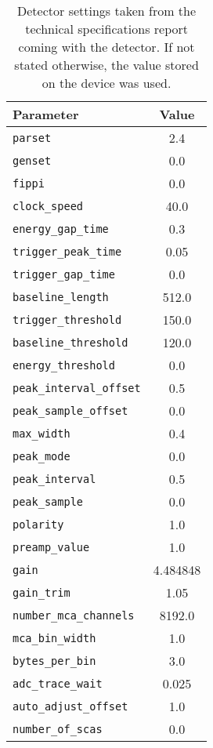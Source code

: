         \begin{table}[!h]
            \centering
            \caption[Detector settings]{Detector settings taken from the technical specifications report coming with the detector. If not stated otherwise, the value stored on the device was used.}%
            \label{tab:default detection parameters}
            \begin{tabular}{@{}lS@{}}
                \toprule
                Parameter&      {Value}\\
                \midrule
                \texttt{parset}&     2.4\\
                \texttt{genset}&     0.0\\
                \texttt{fippi}&     0.0\\
                \texttt{clock\_speed}&     40.0\\
                \texttt{energy\_gap\_time}&     0.3\\
                \texttt{trigger\_peak\_time}&     0.05\\
                \texttt{trigger\_gap\_time}&     0.0\\
                \texttt{baseline\_length}&     512.0\\
                \texttt{trigger\_threshold}&     150.0\\
                \texttt{baseline\_threshold}&     120.0\\
                \texttt{energy\_threshold}&     0.0\\
                \texttt{peak\_interval\_offset}&     0.5\\
                \texttt{peak\_sample\_offset}&     0.0\\
                \texttt{max\_width}&     0.4\\
                \texttt{peak\_mode}&     0.0\\
                \texttt{peak\_interval}&     0.5\\
                \texttt{peak\_sample}&     0.0\\
                \texttt{polarity}&     1.0\\
                \texttt{preamp\_value}&     1.0\\
                \texttt{gain}&     4.484848\\
                \texttt{gain\_trim}&     1.05\\
                \texttt{number\_mca\_channels}&     8192.0\\
                \texttt{mca\_bin\_width}&     1.0\\
                \texttt{bytes\_per\_bin}&     3.0\\
                \texttt{adc\_trace\_wait}&     0.025\\
                \texttt{auto\_adjust\_offset}&     1.0\\
                \texttt{number\_of\_scas}&     0.0\\
                \bottomrule
            \end{tabular}
        \end{table}

